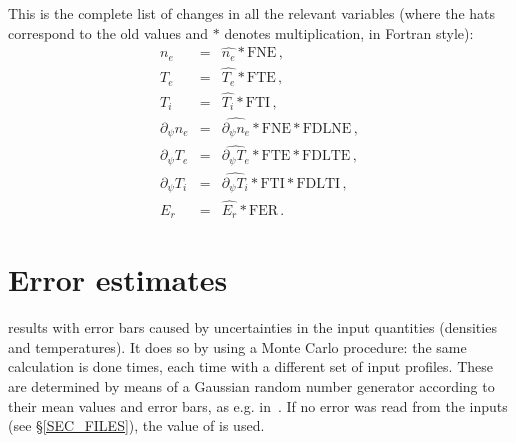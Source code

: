 This is the complete list of changes in all the relevant variables (where the hats correspond to the old values and $*$ denotes multiplication, in Fortran style):
\begin{eqnarray}
  n_e&=& \hat{n_e} *\mathrm{FNE}\,,\nonumber\\
  T_e&=& \hat{T_e} *\mathrm{FTE}\,,\nonumber\\
  T_i&=& \hat{T_i} *\mathrm{FTI}\,,\nonumber\\
  \partial_\psi n_e&=& \hat{\partial_\psi n_e} *\mathrm{FNE} *\mathrm{FDLNE}\,,\nonumber\\
  \partial_\psi T_e&=& \hat{\partial_\psi T_e} *\mathrm{FTE} *\mathrm{FDLTE}\,,\nonumber\\
  \partial_\psi T_i&=& \hat{\partial_\psi T_i} *\mathrm{FTI} *\mathrm{FDLTI}\,,\nonumber\\
  E_r&=& \hat{E_r} *\mathrm{FER}\,.
\end{eqnarray}







\section{Error estimates}\label{SEC_ERROR}

 results with error bars caused by uncertainties in the input quantities (densities and temperatures). It does so by using a Monte Carlo procedure: the same calculation is done  times, each time with a different set of input profiles. These are determined by means of a Gaussian random number generator according to their mean values and error bars, as e.g. in~\cite{velasco2011bootstrap}. If no error was read from the inputs (see \S\ref{SEC_FILES}), the value of  is used.

